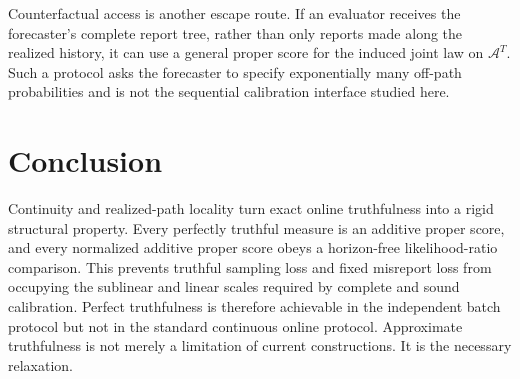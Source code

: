 \documentclass[twoside]{article}
\newcommand{\cA}{\mathcal A}
\newcommand{\1}{\mathbf 1}
\begin{document}
Counterfactual access is another escape route. If an evaluator receives the forecaster's complete report tree, rather than only reports made along the realized history, it can use a general proper score for the induced joint law on $\cA^T$. Such a protocol asks the forecaster to specify exponentially many off-path probabilities and is not the sequential calibration interface studied here.

\section{Conclusion}

Continuity and realized-path locality turn exact online truthfulness into a rigid structural property. Every perfectly truthful measure is an additive proper score, and every normalized additive proper score obeys a horizon-free likelihood-ratio comparison. This prevents truthful sampling loss and fixed misreport loss from occupying the sublinear and linear scales required by complete and sound calibration. Perfect truthfulness is therefore achievable in the independent batch protocol but not in the standard continuous online protocol. Approximate truthfulness is not merely a limitation of current constructions. It is the necessary relaxation.


\end{document}
